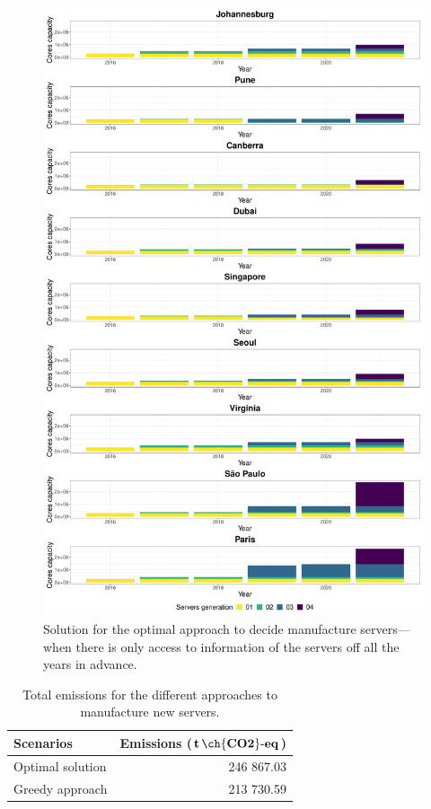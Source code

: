 \begin{figure}[ht]
\centering
  \includegraphics[width=\linewidth]{images/dc_evolution_optimal.pdf}
  \caption{Solution for the optimal approach to decide manufacture servers---when there is only access to information of the servers off all the years in advance.}
  \label{fig:dc_evolution_optimal}
\end{figure}


\begin{table}[!ht]
  
\caption{Total emissions for the different approaches to manufacture new servers.}\label{tab:emissions_sizing} \centering
\begin{tabular}{|l|r|}
  \hline
  \textbf{Scenarios} & \textbf{Emissions ($\mathbf{t\,\ch{CO2}\text{-}eq}$)}   \\
  \hline  
   Optimal solution  &   246 867.03 \\  
  \hline
   Greedy approach                   &   213 730.59  \\
  \hline

\end{tabular}
\end{table}


